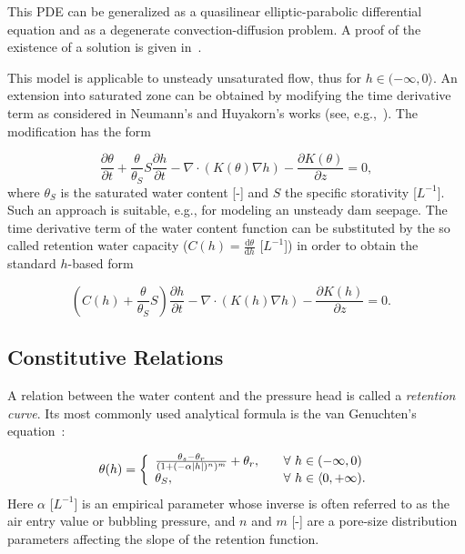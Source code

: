 \documentclass[final,3p,times,twocolumn]{elsarticle}
\begin{document}
This PDE can be generalized as a quasilinear elliptic-parabolic differential equation and as 
a degenerate convection-diffusion problem. A proof of the existence of a   solution  is given in~\cite{alt-luckhaus}. 

This model is applicable to unsteady unsaturated flow, thus for $h \in (-\infty , 0 \rangle$. 
An extension into saturated zone can be obtained by modifying the time derivative term 
as considered in Neumann's and Huyakorn's works (see, e.g.,~\cite{neuman1,neuman2,neuman3,huyakorn1,huyakorn2}). The modification has the form 

\begin{equation}
\label{neuman-mod}
\frac{\partial \theta}{\partial t} + \frac{\theta}{\theta_S} S \frac{\partial h}{\partial t}
- \nabla \cdot \left( K(\theta) \nabla h \right) - \frac{\partial K(\theta)}{\partial z} = 0,
\end{equation}
where $\theta_S$ is the saturated water content [-] and $S$ the specific storativity 
[$L^{-1}$]. Such an approach is suitable, e.g., for modeling an unsteady dam seepage.
The time derivative term of the water content function can be substituted by 
the so called retention water capacity ($C(h) = \frac{\textrm{d}\theta}{\textrm{d} h}$ [$L^{-1}$])
in order to obtain the standard $h$-based form

\begin{equation}\label{rich-final}
\left(C(h)
+ \frac{\theta}{\theta_S} S \right) \frac{\partial h}{\partial t}
- \nabla \cdot \left( K(h) \nabla h \right) - \frac{\partial K(h)}{\partial z} = 0.\ \ \ \ 
\end{equation}

\subsection{Constitutive Relations}

A relation between the water content and the pressure head is called 
a {\em retention curve}. Its most commonly used analytical formula is 
the van Genuchten's equation~\cite{vangenuchten}:

\begin{equation}
\label{vangenuchten-eq}
\theta (h) = \left\{ 
\begin{array}{l l}
 \frac{\theta_s -\theta_r}{(1+(-\alpha |h|)^n)^m} + \theta_r,  & \quad \mbox{$\forall$ $h \in (-\infty, 0 )$}\\
  \theta_S, & \quad \mbox{$\forall$ $h \in \langle 0, + \infty )$}.\\
\end{array} \right.
\end{equation}
Here $\alpha$ [$L^{-1}$] is an empirical parameter  whose inverse is often 
referred to as the air entry value or bubbling pressure, and $n$ and $m$ [-]  
are a pore-size distribution parameters affecting the slope of the retention 
function.
\end{document}
